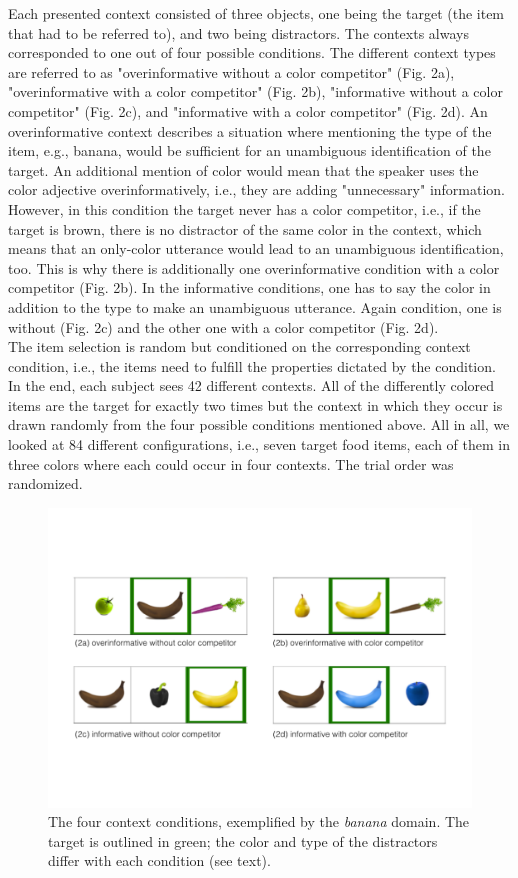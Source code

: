 \documentclass[10pt,letterpaper]{article}
\begin{document}
Each presented context consisted of three objects, one being the target (the item that had to be referred to), and two being distractors. The contexts always corresponded to one out of four possible conditions. The different context types are referred to as "overinformative without a color competitor" (Fig. 2a), "overinformative with a color competitor" (Fig. 2b), "informative without a color competitor" (Fig. 2c), and "informative with a color competitor" (Fig. 2d). An overinformative context describes a situation where mentioning the type of the item, e.g., banana, would be sufficient for an unambiguous identification of the target. An additional mention of color would mean that the speaker uses the color adjective overinformatively, i.e., they are adding "unnecessary" information. However, in this condition the target never has a color competitor, i.e., if the target is brown, there is no distractor of the same color in the context, which means that an only-color utterance would lead to an unambiguous identification, too. This is why there is additionally one overinformative condition with a color competitor (Fig. 2b). In the informative conditions, one has to say the color in addition to the type to make an unambiguous utterance. Again condition, one is without (Fig. 2c) and the other one with a color competitor (Fig. 2d).
\\The item selection is random but conditioned on the corresponding context condition, i.e., the items need to fulfill the properties dictated by the condition. In the end, each subject sees 42 different contexts. All of the differently colored items are the target for exactly two times but the context in which they occur is drawn randomly from the four possible conditions mentioned above. All in all, we looked at 84 different configurations, i.e., seven target food items, each of them in three colors where each could occur in four contexts. The trial order was randomized.

\begin{figure}[bt!]
\centering
\includegraphics[width=.5\textwidth]{graphs/design_1}
\caption{The four context conditions, exemplified by the \textit{banana} domain. The target is outlined in green; the color and type of the distractors differ with each condition (see text).
}
\label{fig:design}
\end{figure}
\end{document}
